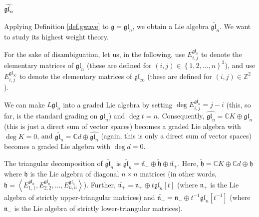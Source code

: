 \documentclass[etingof-lie.tex]{subfiles}
\begin{document}
\subsubsection{\texorpdfstring{$\protect\widetilde{\mathfrak{gl}_{n}}$}
{gl-n-tilde}}

Applying Definition \ref{def.gwave} to $\mathfrak{g}=\mathfrak{gl}_{n}$, we
obtain a Lie algebra $\widetilde{\mathfrak{gl}_{n}}$. We want to study its
highest weight theory.

\begin{Convention}
For the sake of disambiguation, let us, in the following, use $E_{i,j}%
^{\mathfrak{gl}_{n}}$ to denote the elementary matrices of $\mathfrak{gl}_{n}$
(these are defined for $\left(  i,j\right)  \in\left\{  1,2,...,n\right\}
^{2}$), and use $E_{i,j}^{\mathfrak{gl}_{\infty}}$ to denote the elementary
matrices of $\mathfrak{gl}_{\infty}$ (these are defined for $\left(
i,j\right)  \in\mathbb{Z}^{2}$).
\end{Convention}

\begin{definition}
We can make $L\mathfrak{gl}_{n}$ into a graded Lie algebra by setting $\deg
E_{i,j}^{\mathfrak{gl}_{n}}=j-i$ (this, so far, is the standard grading on
$\mathfrak{gl}_{n}$) and $\deg t=n$. Consequently, $\widehat{\mathfrak{gl}%
_{n}}=\mathbb{C}K\oplus\mathfrak{gl}_{n}$ (this is just a direct sum of vector
spaces) becomes a graded Lie algebra with $\deg K=0$, and
$\widetilde{\mathfrak{gl}_{n}}=\mathbb{C}d\oplus\widehat{\mathfrak{gl}_{n}}$
(again, this is only a direct sum of vector spaces) becomes a graded Lie
algebra with $\deg d=0$.
\end{definition}

The triangular decomposition of $\widetilde{\mathfrak{gl}_{n}}$ is
$\widetilde{\mathfrak{gl}_{n}}=\widetilde{\mathfrak{n}_{-}}\oplus
\widetilde{\mathfrak{h}}\oplus\widetilde{\mathfrak{n}_{+}}$. Here,
$\widetilde{\mathfrak{h}}=\mathbb{C}K\oplus\mathbb{C}d\oplus\mathfrak{h}$
where $\mathfrak{h}$ is the Lie algebra of diagonal $n\times n$ matrices (in
other words, $\mathfrak{h}=\left\langle E_{1,1}^{\mathfrak{gl}_{n}}%
,E_{2,2}^{\mathfrak{gl}_{n}},...,E_{n,n}^{\mathfrak{gl}_{n}}\right\rangle $).
Further, $\widetilde{\mathfrak{n}_{+}}=\mathfrak{n}_{+}\oplus t\mathfrak{gl}%
_{n}\left[  t\right]  $ (where $\mathfrak{n}_{+}$ is the Lie algebra of
strictly upper-triangular matrices) and $\widetilde{\mathfrak{n}_{-}%
}=\mathfrak{n}_{-}\oplus t^{-1}\mathfrak{gl}_{n}\left[  t^{-1}\right]  $
(where $\mathfrak{n}_{-}$ is the Lie algebra of strictly lower-triangular matrices).
\end{document}
